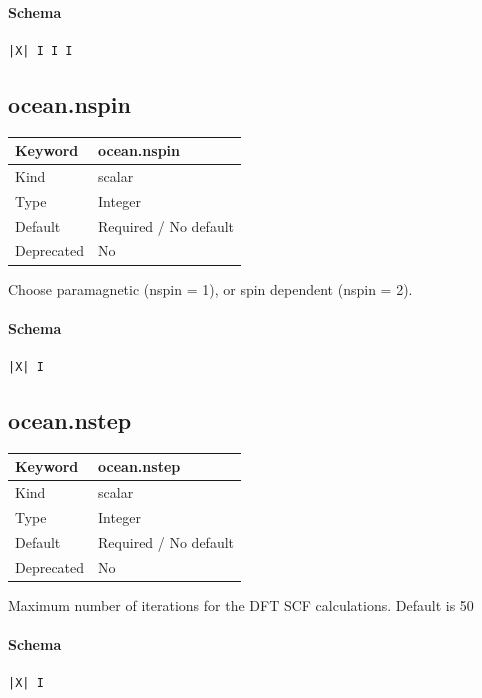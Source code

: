 \documentclass[11pt]{article}
\begin{document}
{{{{{\paragraph{Schema}
\begin{Verbatim}
|X| I I I
\end{Verbatim}

\subsection{ocean.nspin}
\label{kw:ocean-nspin}
\begin{longtable}{|p{1.5in}|p{4.5in}|}
\hline
Keyword & ocean.nspin \\
\hline
Kind & scalar \\
\hline
Type & Integer \\
\hline
Default & Required / No default \\
\hline
Deprecated & No \\
\hline
\end{longtable}
 Choose paramagnetic (nspin = 1), or spin dependent (nspin = 2).

\paragraph{Schema}
\begin{Verbatim}
|X| I
\end{Verbatim}

\subsection{ocean.nstep}
\label{kw:ocean-nstep}
\begin{longtable}{|p{1.5in}|p{4.5in}|}
\hline
Keyword & ocean.nstep \\
\hline
Kind & scalar \\
\hline
Type & Integer \\
\hline
Default & Required / No default \\
\hline
Deprecated & No \\
\hline
\end{longtable}
 Maximum number of iterations for the DFT SCF calculations. Default is 50

\paragraph{Schema}
\begin{Verbatim}
|X| I
\end{Verbatim}

}}}}}
\end{document}
